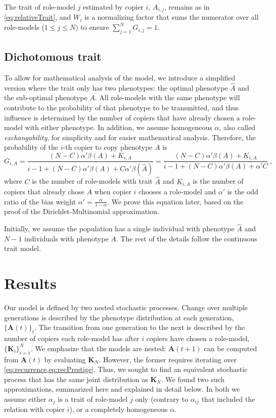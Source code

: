 \documentclass[12pt]{extarticle}
\let\vec\mathbf
\begin{document}
The trait of role-model $j$ estimated by copier $i$, $A_{i,j}$, remains as in \cref{eq:relativeTrait}, and $W_i$ is a normalizing factor that sums the numerator over all role-models ($1\le j \le N)$ to ensure $\sum_{j=1}^{N}{G_{i,j}}=1$.



\subsection*{Dichotomous trait}
To allow for mathematical analysis of the model, we introduce a simplified version where the trait only has two phenotypes: the optimal phenotype $\hat{A}$ and the sub-optimal phenotype $A$. 
All role-models with the same phenotype will contribute to the probability of that phenotype to be transmitted, and thus influence is determined by the number of copiers that have already chosen a role-model with either phenotype.
In addition, we assume homogeneous $\alpha$, also called \emph{exchangability}, for simplicity and for easier mathematical analysis.
Therefore, the probability of the $i$-th copier to copy phenotype $A$ is
\begin{equation}\label{eq:binary-model}
G_{i,A} = \frac{(N-C)\alpha'\beta(A) + K_{i,A}}{i-1 + (N-C)\alpha'\beta(A) + C\alpha'\beta(\hat{A})} = \frac{(N-C)\alpha'\beta(A) + K_{i,A}}{i-1 + (N-C)\alpha'\beta(A) + \alpha'C} \;,
\end{equation}
where $C$ is the number of role-models with trait $\hat{A}$ and $K_{i,A}$ is the number of copiers that already chose $A$ when copier $i$ chooses a role-model and $\alpha'$ is the odd ratio of the bias weight $\alpha'= \frac{\alpha}{1-\alpha}$.
We prove this equation later, based on the proof of the Dirichlet-Multinomial approximation.

Initially, we assume the population has a single individual with phenotype $\hat{A}$ and $N-1$ individuals with phenotype $A$. The rest of the details follow the continuous trait model.

\section*{Results}
Our model is defined by two nested stochastic processes. Change over multiple generations is described by the phenotype distribution at each generation, $\{\vec{A}(t)\}_t$. The transition from one generation to the next is described by the number of copiers each role-model has after $i$ copiers have chosen a role-model, $\{\vec{K}_i\}_{i=1}^N$.
We emphasize that the models are nested: $\vec{A}(t+1)$ can be computed from $\vec{A}(t)$ by evaluating $\vec{K}_{N}$. However, the former requires iterating over \cref{eq:recurrence,eq:recPrestige}.
Thus, we sought to find an equivalent stochastic process that has the same joint distribution as $\vec{K}_{N}$. 
We found two such approximations, summarized here and explained in detail below. In both we assume either $\alpha_j$ is a trait of role-model $j$ only (contrary to $\alpha_{ij}$ that included the relation with copier $i$), or a completely homogeneous $\alpha$.
\end{document}
